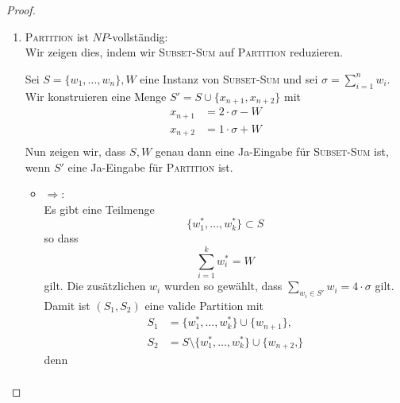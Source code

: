 \documentclass[a4paper]{scrartcl}
\begin{document}
\begin{enumerate}[label=\bfseries \arabic*.]
\begin{enumerate}
\begin{proof}
\begin{enumerate}
                \item \textsc{Partition} ist $NP$-vollständig: \\
                    Wir zeigen dies, indem wir \textsc{Subset-Sum} auf
                    \textsc{Partition} reduzieren.

                    Sei $S = \{w_1, \dotsc, w_n\}, W$ eine Instanz von
                    \textsc{Subset-Sum} und sei $\sigma = \sum_{i=1}^n w_i$.
                    Wir konstruieren eine Menge $S' = S \cup \{x_{n+1}, x_{n+2}\}$ mit
                    \begin{align*}
                        x_{n+1} &= 2 \cdot \sigma - W \\
                        x_{n+2} &= 1 \cdot \sigma + W \\
                    \end{align*}
                    Nun zeigen wir, dass $S, W$ genau dann eine Ja-Eingabe für
                    \textsc{Subset-Sum} ist, wenn $S'$ eine Ja-Eingabe für
                    \textsc{Partition} ist.
                    \begin{itemize}
                        \item $\Rightarrow$: \\
                            Es gibt eine Teilmenge
                            \begin{equation*}
                                \{w^\ast_1, \dotsc, w^\ast_k\} \subset S
                            \end{equation*}
                            so dass
                            \begin{equation*}
                                \sum_{i=1}^k w^\ast_i = W
                            \end{equation*}
                            gilt.
                            Die zusätzlichen $w_i$ wurden so gewählt, dass
                            $\sum_{w_i \in S'} w_i = 4 \cdot \sigma$ gilt.
                            Damit ist $(S_1,S_2)$ eine valide Partition mit
                            \begin{align*}
                                S_1 &= \{w^\ast_1, \dotsc, w^\ast_k\} \cup \{w_{n+1}\} \text{,} \\
                                S_2 &= S \setminus \{w^\ast_1, \dotsc, w^\ast_k\} \cup \{w_{n+2} \text{,} \}
                            \end{align*}
                            denn
                            \begin{gather*}

\end{gather*}
\end{itemize}
\end{enumerate}
\end{proof}
\end{enumerate}
\end{enumerate}
\end{document}
